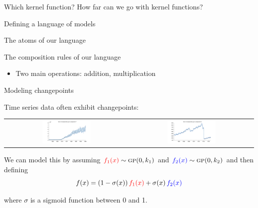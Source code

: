 \begin{frame}{Which kernel function?}
  How far can we go with kernel functions?
\end{frame}

\begin{frame}{Defining a language of models}
  
\end{frame}

\begin{frame}{The atoms of our language}  
  
\end{frame}

\begin{frame}{The composition rules of our language}
\begin{itemize} 
	\item Two main operations: addition, multiplication
\end{itemize}

\end{frame}

\begin{frame}{Modeling changepoints}
  
  Time series data often exhibit changepoints:
  
  \begin{center}
  \begin{tabular}{cc}
    \includegraphics[width=0.4\textwidth]{figures/09-gas-production_7_cum} &
    \includegraphics[width=0.4\textwidth]{figures/07-call-centre_6_cum} 
  \end{tabular}
  \end{center}
  
  \pause

  We can model this by assuming $\textcolor{red}{f_1(x)} \sim {\textsc{gp}}{}(0,k_1)$ and $\textcolor{blue}{f_2(x)} \sim {\textsc{gp}}{}(0,k_2)$ and then defining
\[
f(x) = (1-\sigma(x))\, \textcolor{red}{f_1(x)} + \sigma(x)\, \textcolor{blue}{f_2(x)}
\]

where $\sigma$ is a sigmoid function between 0 and 1.
\end{frame}

